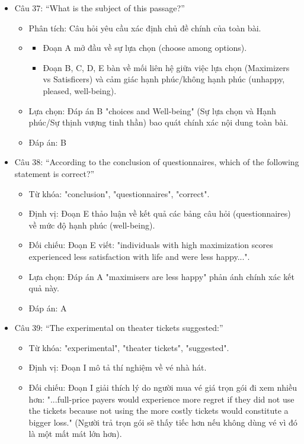 \documentclass{../templateReading/cdreading}
\begin{document}
\begin{itemize}
\item Câu 37: “What is the subject of this passage?”
\begin{itemize}
\item Phân tích: Câu hỏi yêu cầu xác định chủ đề chính của toàn bài.
\item {}
\begin{itemize}
\item Đoạn A mở đầu về sự lựa chọn (choose among options).
\item Đoạn B, C, D, E bàn về mối liên hệ giữa việc lựa chọn (Maximizers vs Satisficers) và cảm giác hạnh phúc/không hạnh phúc (unhappy, pleased, well-being).
\end{itemize}
\item Lựa chọn: Đáp án B "choices and Well-being" (Sự lựa chọn và Hạnh phúc/Sự thịnh vượng tinh thần) bao quát chính xác nội dung toàn bài.
\item Đáp án: B
\end{itemize}
\item Câu 38: “According to the conclusion of questionnaires, which of the following statement is correct?”
\begin{itemize}
\item Từ khóa: "conclusion", "questionnaires", "correct".
\item Định vị: Đoạn E thảo luận về kết quả các bảng câu hỏi (questionnaires) về mức độ hạnh phúc (well-being).
\item Đối chiếu: Đoạn E viết: "individuals with high maximization scores experienced less satisfaction with life and were less happy...".
\item Lựa chọn: Đáp án A "maximisers are less happy" phản ánh chính xác kết quả này.
\item Đáp án: A
\end{itemize}
\item Câu 39: “The experimental on theater tickets suggested:”
\begin{itemize}
\item Từ khóa: "experimental", "theater tickets", "suggested".
\item Định vị: Đoạn I mô tả thí nghiệm về vé nhà hát.
\item Đối chiếu: Đoạn I giải thích lý do người mua vé giá trọn gói đi xem nhiều hơn: "...full-price payers would experience more regret if they did not use the tickets because not using the more costly tickets would constitute a bigger loss." (Người trả trọn gói sẽ thấy tiếc hơn nếu không dùng vé vì đó là một mất mát lớn hơn).

\end{itemize}
\end{itemize}
\end{document}
